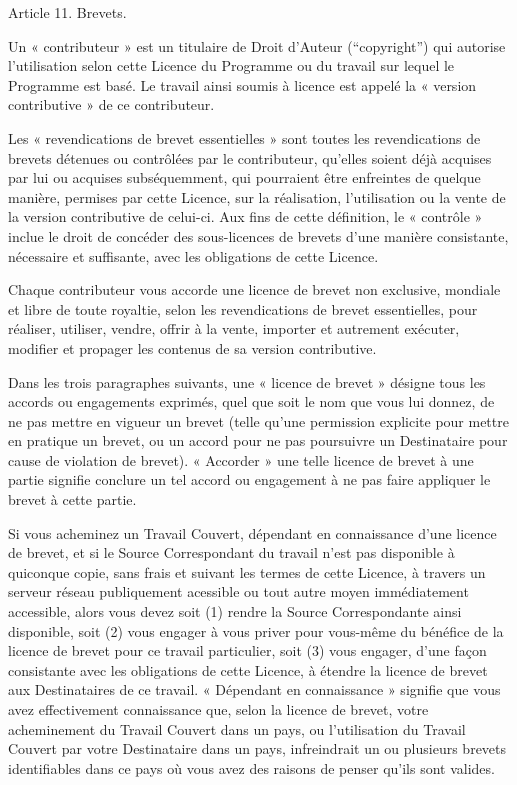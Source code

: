 {Article 11. Brevets.

Un « contributeur » est un titulaire de Droit d’Auteur (“copyright”)
qui autorise l’utilisation selon cette Licence du Programme ou du
travail sur lequel le Programme est basé. Le travail ainsi soumis à
licence est appelé la « version contributive » de ce contributeur.

Les « revendications de brevet essentielles » sont toutes les
revendications de brevets détenues ou contrôlées par le contributeur,
qu’elles soient déjà acquises par lui ou acquises subséquemment, qui
pourraient être enfreintes de quelque manière, permises par cette
Licence, sur la réalisation, l’utilisation ou la vente de la version
contributive de celui-ci. Aux fins de cette définition, le « contrôle »
inclue le droit de concéder des sous-licences de brevets d’une manière
consistante, nécessaire et suffisante, avec les obligations de cette
Licence.

Chaque contributeur vous accorde une licence de brevet non exclusive,
mondiale et libre de toute royaltie, selon les revendications de brevet
essentielles, pour réaliser, utiliser, vendre, offrir à la vente,
importer et autrement exécuter, modifier et propager les contenus de sa
version contributive.

Dans les trois paragraphes suivants, une « licence de brevet » désigne
tous les accords ou engagements exprimés, quel que soit le nom que vous
lui donnez, de ne pas mettre en vigueur un brevet (telle qu’une
permission explicite pour mettre en pratique un brevet, ou un accord
pour ne pas poursuivre un Destinataire pour cause de violation de
brevet). « Accorder » une telle licence de brevet à une partie signifie
conclure un tel accord ou engagement à ne pas faire appliquer le brevet
à cette partie.

Si vous acheminez un Travail Couvert, dépendant en connaissance d’une
licence de brevet, et si le Source Correspondant du travail n’est pas
disponible à quiconque copie, sans frais et suivant les termes de cette
Licence, à travers un serveur réseau publiquement acessible ou tout
autre moyen immédiatement accessible, alors vous devez soit (1) rendre
la Source Correspondante ainsi disponible, soit (2) vous engager à vous
priver pour vous-même du bénéfice de la licence de brevet pour ce
travail particulier, soit (3) vous engager, d’une façon consistante
avec les obligations de cette Licence, à étendre la licence de brevet
aux Destinataires de ce travail. « Dépendant en connaissance » signifie
que vous avez effectivement connaissance que, selon la licence de
brevet, votre acheminement du Travail Couvert dans un pays, ou
l’utilisation du Travail Couvert par votre Destinataire dans un pays,
infreindrait un ou plusieurs brevets identifiables dans ce pays où vous
avez des raisons de penser qu’ils sont valides.

}
